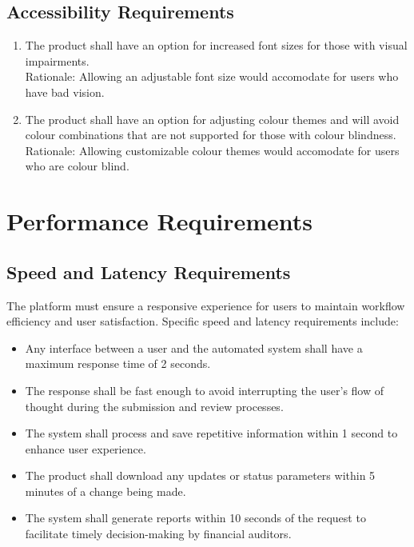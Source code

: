 \documentclass[12pt]{article}
\begin{document}
\subsection{Accessibility Requirements}

\begin{enumerate}
  
  \item The product shall have an option for increased font sizes for those with visual impairments. \\
  Rationale: Allowing an adjustable font size would accomodate for users who have bad vision.
  \item The product shall have an option for adjusting colour themes and will avoid colour combinations that are not supported for those with colour blindness. \\
  Rationale: Allowing customizable colour themes would accomodate for users who are colour blind.
\end{enumerate}
\section{Performance Requirements}

\subsection{Speed and Latency Requirements}
The platform must ensure a responsive experience for users to maintain workflow efficiency and user satisfaction. Specific speed and latency requirements include:

\begin{itemize}
    \item Any interface between a user and the automated system shall have a maximum response time of 2 seconds.
    \item The response shall be fast enough to avoid interrupting the user’s flow of thought during the submission and review processes.
    \item The system shall process and save repetitive information within 1 second to enhance user experience.
    \item The product shall download any updates or status parameters within 5 minutes of a change being made.
    \item The system shall generate reports within 10 seconds of the request to facilitate timely decision-making by financial auditors.
\end{itemize}
\end{document}
